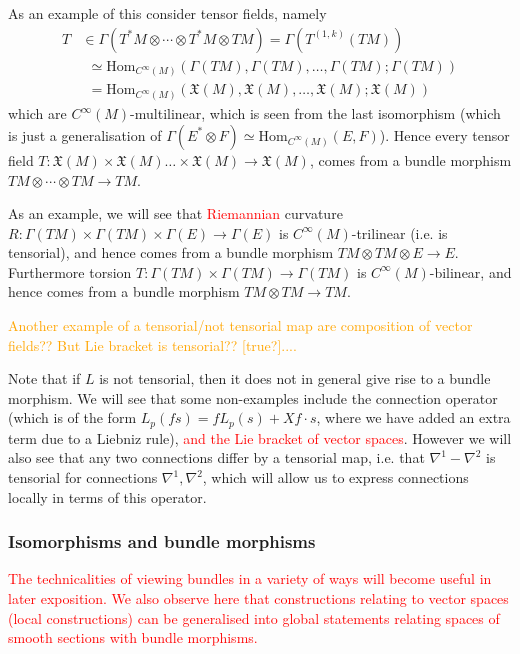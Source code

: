 \documentclass[a4paper]{article}
\theoremstyle{definition} \newtheorem*{definition}{Definition}
\theoremstyle{definition} \newtheorem*{definitions}{Definitions}
\theoremstyle{plain} \newtheorem{theorem}{Theorem}[section]
\theoremstyle{plain} \newtheorem{proposition}[theorem]{Proposition}
\theoremstyle{plain} \newtheorem{corollary}[theorem]{Corollary}
\theoremstyle{plain} \newtheorem{lemma}[theorem]{Lemma}
\theoremstyle{plain} \newtheorem{example}[theorem]{Example}
\newcommand{\checkCorrect}[1]{\textcolor{red}{#1}}
\newcommand{\understandBetter}[1]{\textcolor{orange}{#1}}
\newcommand{\Hom}{\text{Hom}}
\newcommand{\smooth}{C^\infty}
\begin{document}
As an example of this consider tensor fields, namely 
\begin{align*}
T & \in \Gamma(T^*M\otimes \cdots \otimes T^*M \otimes TM) = \Gamma(T^{(1, k)}(TM)) \\
& \ \ \simeq \text{Hom}_{\smooth(M)}(\Gamma(TM), \Gamma(TM), \ldots, \Gamma(TM); \Gamma(TM)) \\
& \ \ = \text{Hom}_{\smooth(M)}(\mathfrak{X}(M), \mathfrak{X}(M), \ldots, \mathfrak{X}(M); \mathfrak{X}(M))
\end{align*}
which are $\smooth(M)$-multilinear, which is seen from the last isomorphism (which is just a generalisation of $\Gamma(E^*\otimes F)\simeq \Hom_{\smooth (M)}(E, F)$). Hence every tensor field  $T:\mathfrak{X}(M)\times \mathfrak{X}(M) \ldots \times \mathfrak{X}(M)\to \mathfrak{X}(M)$, comes from a bundle morphism $TM\otimes \cdots \otimes TM\to TM$.

As an example, we will see that \checkCorrect{Riemannian} curvature $R:\Gamma(TM)\times \Gamma(TM) \times \Gamma(E)\to \Gamma(E)$ is $\smooth(M)$-trilinear (i.e. is tensorial), and hence comes from a bundle morphism $TM\otimes TM\otimes E\to E$. Furthermore torsion $T:\Gamma(TM)\times \Gamma(TM)\to \Gamma(TM)$ is $\smooth (M)$-bilinear, and hence comes from a bundle morphism $TM\otimes TM\to TM$.

\understandBetter{Another example of a tensorial/not tensorial map are composition of vector fields?? But Lie bracket is tensorial?? [true?]....}

Note that if $L$ is not tensorial, then it does not in general give rise to a bundle morphism. We will see that some non-examples include the connection operator (which is of the form $L_p(fs)=fL_p(s)+X f\cdot s$, where we have added an extra term due to a Liebniz rule), \checkCorrect{and the Lie bracket of vector spaces}. However we will also see that any two connections differ by a tensorial map, i.e. that $\nabla^1-\nabla^2$ is tensorial for connections $\nabla^1, \nabla^2$, which will allow us to express connections locally in terms of this operator.


\subsubsection{Isomorphisms and bundle morphisms}
\checkCorrect{The technicalities of viewing bundles in a variety of ways will become useful in later exposition. We also observe here that constructions relating to vector spaces (local constructions) can be generalised into global statements relating spaces of smooth sections with bundle morphisms.}
\end{document}
